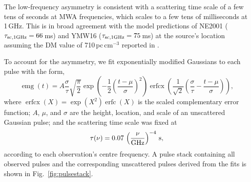 \documentclass[fleqn,usenatbib]{mnras}
\DeclareMathOperator{\erfcx}{erfcx}
\DeclareMathOperator{\erfc}{erfc}
\DeclareMathOperator{\emg}{emg}
\newcommand{\Fig}{Fig.}
\begin{document}
The low-frequency asymmetry is consistent with a scattering time scale of a few tens of seconds at MWA frequencies, which scales to a few tens of milliseconds at 1\,GHz.
This is in broad agreement with the model predictions of NE2001 ($\tau_{\rm sc,1GHz} = 66\,$ms) and YMW16 ($\tau_{\rm sc,1 GHz} = 75\,$ms) at the source's location assuming the DM value of 710\,pc\,cm$^{-3}$ reported in .

To account for the asymmetry, we fit exponentially modified Gaussians to each pulse with the form,
\begin{equation}
  \emg(t) = A \frac{\sigma}{\tau}\sqrt{\frac{\pi}{2}}
    \exp\left(-\frac12 \left( \frac{t - \mu}{\sigma} \right)^2 \right)  \erfcx \left(\frac{1}{\sqrt{2}} \left(\frac{\sigma}{\tau} - \frac{t - \mu}{\sigma} \right) \right),
  \label{eqn:emg}
\end{equation}
where $\erfcx(X) = \exp(X^2) \erfc(X)$ is the scaled complementary error function; $A$, $\mu$, and $\sigma$ are the height, location, and scale of an unscattered Gaussian pulse; and the scattering time scale was fixed at
\begin{equation}
      \tau(\nu) = 0.07\, \left(\frac{\nu}{\rm GHz}\right)^{-4} \, {\rm s},
\end{equation}
according to each observation's centre frequency.
A pulse stack containing all observed pulses and the corresponding unscattered pulses derived from the fits is shown in \Fig~\ref{fig:pulsestack}.
\end{document}
